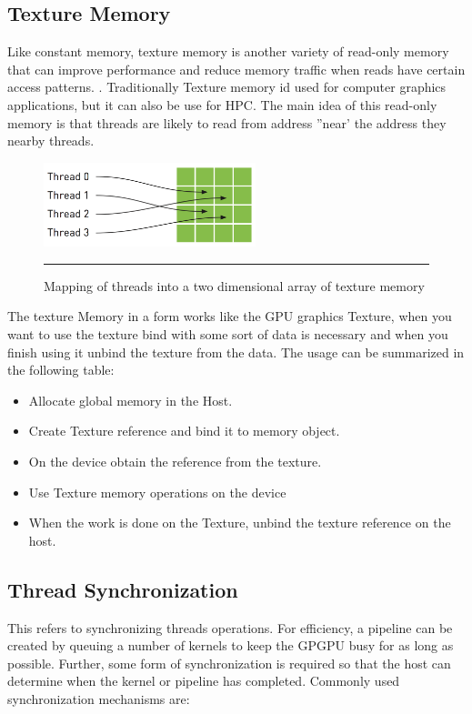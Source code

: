 \subsection{Texture Memory}

Like constant memory, texture memory is another variety of read-only memory that can improve performance and reduce memory traffic when reads have certain access patterns. . Traditionally Texture memory id used for computer graphics applications, but it can also be use for HPC. The main idea of this read-only memory is that threads are likely to read from address ''near' the address they nearby threads.\cite{example}


\begin{figure}[htbp]
	\centering
		\includegraphics[width=0.55\textwidth]{Figures/texture.png}
		\rule{35em}{0.5pt}
	\caption[Texture Memory]{Mapping of threads into a two dimensional array of texture memory}
	\label{fig:texture}
\end{figure}

The texture Memory in a form works like the GPU graphics Texture, when you want to use the texture bind with some sort of data is necessary and when you finish using it unbind the texture from the data. The usage can be summarized in the following table:

\begin{itemize}
\item Allocate global memory in the Host.
\item Create Texture reference and bind it to memory object.
\item On the device obtain the reference from the texture.
\item  Use Texture memory operations on the device
\item  When the work is done on the Texture, unbind the texture reference on the host.
\end{itemize}

\subsection{Thread Synchronization}

This refers to synchronizing threads operations. For efficiency, a pipeline can be created by queuing a number of kernels to keep the GPGPU busy for as long as possible. Further, some form of synchronization is required so that the host can determine when the kernel or pipeline has completed. \cite{design} Commonly used synchronization mechanisms are:

